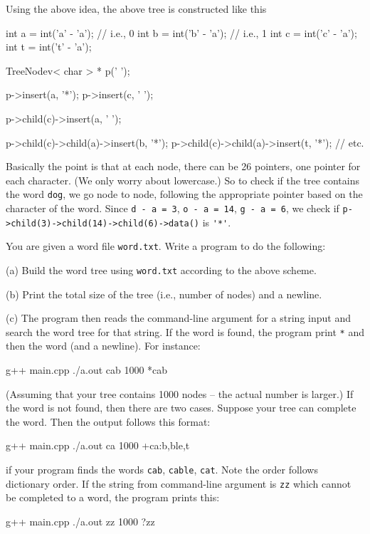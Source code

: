 Using the above idea, the above tree is constructed like this
\begin{console}[fontsize=\footnotesize]
int a = int('a' - 'a'); // i.e., 0
int b = int('b' - 'a'); // i.e., 1
int c = int('c' - 'a'); 
int t = int('t' - 'a');

TreeNodev< char > * p(' ');

p->insert(a, '*');
p->insert(c, ' ');

p->child(c)->insert(a, ' ');

p->child(c)->child(a)->insert(b, '*');
p->child(c)->child(a)->insert(t, '*');
// etc.
\end{console}

Basically the point is that at each node,
there can be 26 pointers, one pointer for each character.
(We only worry about lowercase.)
So to check if the tree contains the word \verb!dog!,
we go node to node,
following the appropriate pointer based on the character of the word.
Since \verb!d - a = 3!,
\verb!o - a = 14!,
\verb!g - a = 6!,
we check if 
\verb!p->child(3)->child(14)->child(6)->data()!
is \verb!'*'!.

You are given a word file \verb!word.txt!.
Write a program to do the following:

(a) Build the word tree using \verb!word.txt! according to the above scheme.

(b) Print the total size of the tree (i.e., number of nodes) and a newline.

(c) The program then reads the command-line argument for a string input and
  search the word tree for that string.
If the word is found, the program
print \verb!*! and then the word (and a newline).
For instance:
\begin{console}[commandchars=\\\{\},fontsize=\footnotesize]
g++ main.cpp
./a.out cab
1000
*cab
\end{console}
(Assuming that your tree contains 1000 nodes -- the actual number
is larger.)
If the word is not found, then there are two cases.
Suppose your tree can complete the word.
Then the output follows this format:
\begin{console}[commandchars=\\\{\},fontsize=\footnotesize]
g++ main.cpp
./a.out ca
1000
+ca:b,ble,t
\end{console}
if your program
finds the words \verb!cab!, \verb!cable!, \verb!cat!.
Note the order follows dictionary order.
If the string from command-line argument is \verb!zz!
which cannot be completed to a word, the program prints this:
\begin{console}[commandchars=\\\{\},fontsize=\footnotesize]
g++ main.cpp
./a.out zz
1000
?zz
\end{console}
